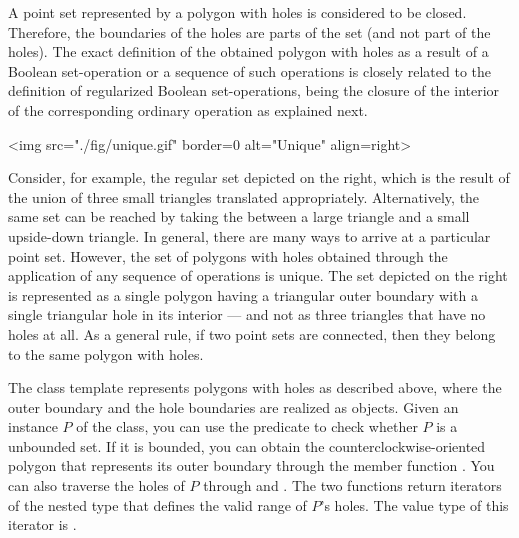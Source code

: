 A point set represented by a polygon with holes is considered to be
closed. Therefore, the boundaries of the holes are parts of the set
(and not part of the holes).
The exact definition of the obtained polygon with holes as a result of
a Boolean set-operation or a sequence of such operations is closely
related to the definition of regularized Boolean set-operations, being
the closure of the interior of the corresponding ordinary operation as
explained next.
\newpage
\lcTex{%
  \setlength{\BooleanSetOpsWidthRight}{1.4cm}
  \setlength{\BooleanSetOpsWidthLeft}{\BooleanSetOpsWidthLineReal}
  \addtolength{\BooleanSetOpsWidthLeft}{-\BooleanSetOpsWidthRight}
  \begin{minipage}{\BooleanSetOpsWidthLeft}
}
\label{fig:unique}
\begin{ccHtmlOnly}
  <img src="./fig/unique.gif" border=0 alt="Unique" align=right>
\end{ccHtmlOnly}
Consider, for example, the regular set depicted on the right, which is
the result of the union of three small triangles translated
appropriately. Alternatively, the same set can be reached by taking
the  between a large triangle and a small
upside-down triangle. In general, there are many ways to arrive at 
a particular point set. However, the set of polygons with holes
obtained through the application of any sequence of operations is
unique. The set depicted on the right is represented as a single
polygon having a triangular outer boundary with a single triangular
hole in its interior --- and not as three triangles that have no holes
at all. As a general rule, if two point sets are connected, then they
belong to the same polygon with holes.

The class template 
represents polygons with holes as described above, where the outer
boundary and the hole boundaries are realized as
 objects. Given an instance $P$ of
the  class, you can use the predicate
 to check whether $P$ is a unbounded set. If it is
bounded, you can obtain the counterclockwise-oriented polygon that
represents its outer boundary through the member function
. You can also traverse the holes of $P$ through
 and . The two functions return
iterators of the nested type
 that  
defines the valid range of $P$'s holes. The value type of this
iterator is .

